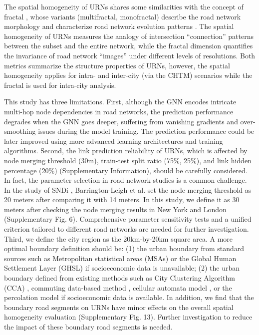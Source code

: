 \documentclass[10pt]{wlscirep}
\begin{document}
The spatial homogeneity of URNs shares some similarities with the concept of fractal \cite{mandelbrot1982fractal,falconer1999techniques,meakin1983formation}, whose variants (multifractal, monofractal) describe the road network morphology \cite{batty1994fractal,sidqi2019comparing,molinero2021geometry,ariza2013multifractal} and characterize road network evolution patterns \cite{makse1998modeling,murcio2015multifractal}. The spatial homogeneity of URNs measures the analogy of intersection “connection” patterns between the subset and the entire network, while the fractal dimension quantifies the invariance of road network “images” under different levels of resolutions. Both metrics summarize the structure properties of URNs, however, the spatial homogeneity applies for intra- and inter-city (via the CHTM) scenarios while the fractal is used for intra-city analysis. 

This study has three limitations. First, although the GNN encodes intricate multi-hop node dependencies in road networks, the prediction performance degrades when the GNN goes deeper, suffering from vanishing gradients \cite{he2016deep} and over-smoothing \cite{chen2020measuring} issues during the model training. The prediction performance could be later improved using more advanced learning architectures and training algorithms. Second, the link prediction reliability of URNs, which is affected by node merging threshold (30m), train-test split ratio (75\%, 25\%), and link hidden percentage (20\%) (Supplementary Information), should be carefully considered. In fact, the parameter selection in road network studies is a common challenge. In the study of SNDi \cite{barrington2019global,barrington2020global}, Barrington-Leigh et al. set the node merging threshold as 20 meters after comparing it with 14 meters. In this study, we define it as 30 meters after checking the node merging results in New York and London (Supplementary Fig. 6). Comprehensive parameter sensitivity tests and a unified criterion tailored to different road networks are needed for further investigation. 
Third, we define the city region as the 20km-by-20km square area. A more optimal boundary definition should be: (1) the urban boundary from standard sources such as Metropolitan statistical areas (MSAs) \cite{berry1969metropolitan} or the Global Human Settlement Layer (GHSL) \cite{corbane2019automated} if socioeconomic data is unavailable; (2) the urban boundary defined from existing methods such as City Clustering Algorithm (CCA) \cite{rozenfeld2008laws}, commuting data-based method \cite{shen2019delineating}, cellular automata model \cite{long2016mapping}, or the percolation model \cite{cao2020quantifying} if socioeconomic data is available. In addition, we find that the boundary road segments on URNs have minor effects on the overall spatial homogeneity evaluation (Supplementary Fig. 13). Further investigation to reduce the impact of these boundary road segments is needed.
\end{document}
